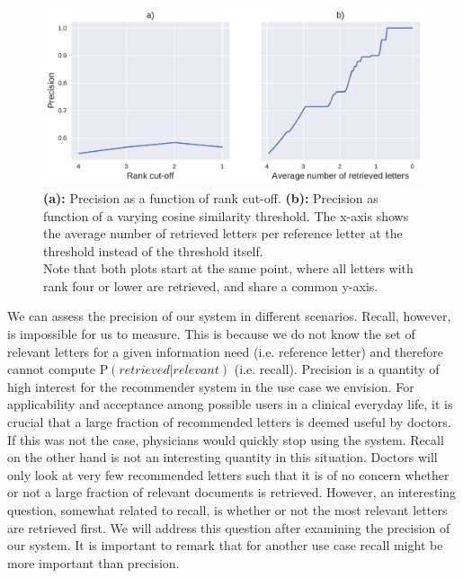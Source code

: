 \begin{figure}
	\includegraphics[width=\linewidth]{figures/precision_rank_sim}
	\caption{\textbf{(a):} Precision as a function of rank cut-off. \textbf{(b):} Precision as function of a varying cosine similarity threshold. The x-axis shows the average number of retrieved letters per reference letter at the threshold instead of the threshold itself.\\
	Note that both plots start at the same point, where all letters with rank four or lower are retrieved, and share a common y-axis.}
	\label{fig:precision}
\end{figure}

We can assess the precision of our system in different scenarios. Recall, however, is impossible for us to measure. This is because we do not know the set of relevant letters for a given information need (i.e. reference letter) and therefore cannot compute P$(retrieved|relevant)$ (i.e. recall). Precision is a quantity of high interest for the recommender system in the use case we envision. For applicability and acceptance among possible users in a clinical everyday life, it is crucial that a large fraction of recommended letters is deemed useful by doctors. If this was not the case, physicians would quickly stop using the system. Recall on the other hand is not an interesting quantity in this situation. Doctors will only look at very few recommended letters such that it is of no concern whether or not a large fraction of relevant documents is retrieved. However, an interesting question, somewhat related to recall, is whether or not the most relevant letters are retrieved first. We will address this question after examining the precision of our system. It is important to remark that for another use case recall might be more important than precision. 

